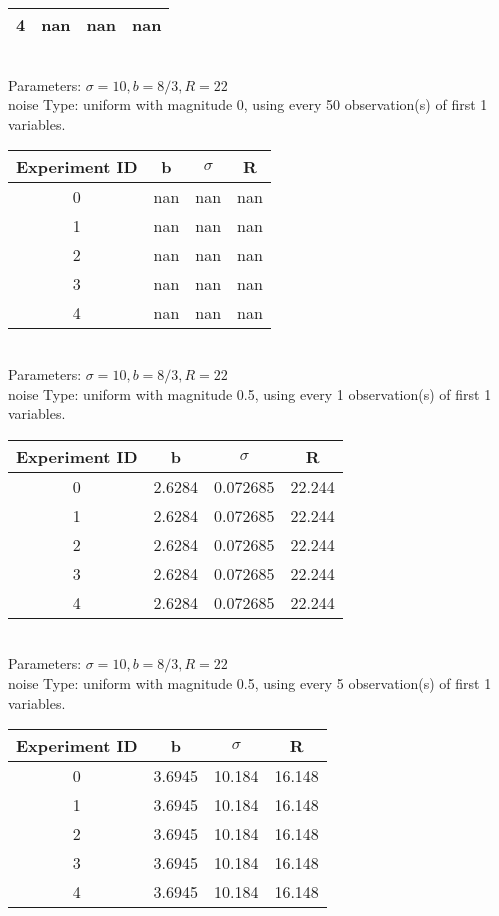 \begin{multicols}{3}
\begin{tabular}{cccc}
 4 & nan & nan & nan\\ \hline 
 \end{tabular}\\
Parameters: $\sigma=10, b=8/3, R=22$\\
noise Type: uniform with magnitude 0, using every 50 observation(s) of first 1 variables.\\
\begin{tabular}{cccc}
\hline Experiment ID & b & $\sigma$ & R \\ \hline 
0 & nan & nan & nan\\ \hline 
 1 & nan & nan & nan\\ \hline 
 2 & nan & nan & nan\\ \hline 
 3 & nan & nan & nan\\ \hline 
 4 & nan & nan & nan\\ \hline 
 \end{tabular}\\
Parameters: $\sigma=10, b=8/3, R=22$\\
noise Type: uniform with magnitude 0.5, using every 1 observation(s) of first 1 variables.\\
\begin{tabular}{cccc}
\hline Experiment ID & b & $\sigma$ & R \\ \hline 
0 & 2.6284 & 0.072685 & 22.244\\ \hline 
 1 & 2.6284 & 0.072685 & 22.244\\ \hline 
 2 & 2.6284 & 0.072685 & 22.244\\ \hline 
 3 & 2.6284 & 0.072685 & 22.244\\ \hline 
 4 & 2.6284 & 0.072685 & 22.244\\ \hline 
 \end{tabular}\\
Parameters: $\sigma=10, b=8/3, R=22$\\
noise Type: uniform with magnitude 0.5, using every 5 observation(s) of first 1 variables.\\
\begin{tabular}{cccc}
\hline Experiment ID & b & $\sigma$ & R \\ \hline 
0 & 3.6945 & 10.184 & 16.148\\ \hline 
 1 & 3.6945 & 10.184 & 16.148\\ \hline 
 2 & 3.6945 & 10.184 & 16.148\\ \hline 
 3 & 3.6945 & 10.184 & 16.148\\ \hline 
 4 & 3.6945 & 10.184 & 16.148\\ \hline 

\end{tabular}
\end{multicols}
